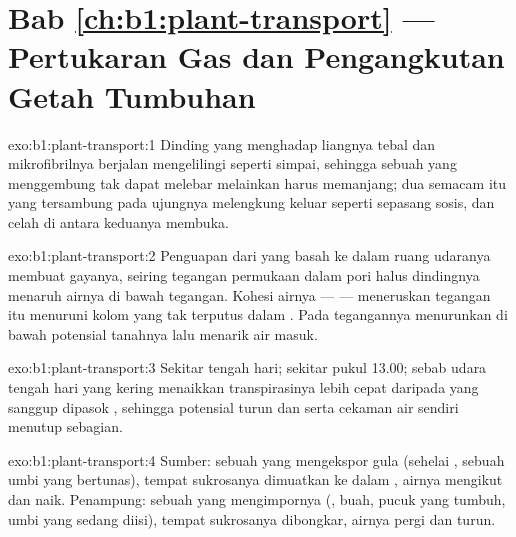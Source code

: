 \section*{Bab \ref{ch:b1:plant-transport} --- Pertukaran Gas dan Pengangkutan Getah Tumbuhan}

\begin{solution}{exo:b1:plant-transport:1}
Dinding yang menghadap liangnya tebal dan mikrofibrilnya berjalan
mengelilingi  seperti simpai, sehingga sebuah  yang
menggembung tak dapat melebar melainkan harus memanjang; dua 
semacam itu yang tersambung pada ujungnya melengkung keluar seperti
sepasang sosis, dan celah di antara keduanya membuka.
\end{solution}

\begin{solution}{exo:b1:plant-transport:2}
Penguapan dari   yang basah ke dalam ruang udaranya
membuat gayanya, seiring tegangan permukaan dalam pori halus
dindingnya menaruh airnya di bawah tegangan. Kohesi airnya ---  --- meneruskan tegangan itu menuruni kolom yang tak
terputus dalam . Pada  tegangannya menurunkan   di bawah potensial tanahnya lalu menarik air masuk.
\end{solution}

\begin{solution}{exo:b1:plant-transport:3}
Sekitar tengah hari; sekitar pukul 13.00; sebab udara tengah hari yang
kering menaikkan transpirasinya lebih cepat daripada yang sanggup
dipasok , sehingga potensial  turun dan 
serta cekaman air  sendiri menutup  sebagian.
\end{solution}

\begin{solution}{exo:b1:plant-transport:4}
Sumber: sebuah  yang mengekspor gula (sehelai , sebuah umbi
yang bertunas), tempat sukrosanya dimuatkan ke dalam ,
airnya mengikut dan  naik. Penampung: sebuah  yang
mengimpornya (, buah, pucuk yang tumbuh, umbi yang sedang diisi),
tempat sukrosanya dibongkar, airnya pergi dan  turun.
\end{solution}

